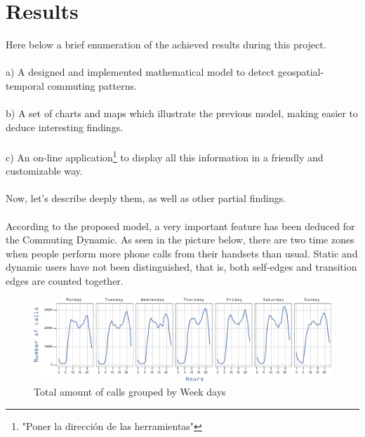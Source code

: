 \newpage
\section{Results}
\label{sec:results}

Here below a brief enumeration of the achieved results during this project.
\\
\\
a) A designed and implemented mathematical model to detect geospatial-temporal commuting patterns.
\\
\\
b) A set of charts and maps which illustrate the previous model, making easier to deduce interesting findings.
\\
\\
c) An on-line application\footnote{"Poner la dirección de las herramientas"} to display all this information in a friendly and customizable way.
\\
\\
Now, let's describe deeply them, as well as other partial findings.
\\
\\
According to the proposed model, a very important feature has been deduced for the Commuting Dynamic. As seen in the picture below, there are two time zones when people perform more phone calls from their handsets than usual. Static and dynamic users have not been distinguished, that is, both self-edges and transition edges are counted together.

\begin{figure}[h]
\begin{center}
\includegraphics[scale =0.8] {results/images/calls_number.pdf}
\caption{Total amount of calls grouped by Week days}
\label{fig:count_calls}
\end{center}
\end{figure}


